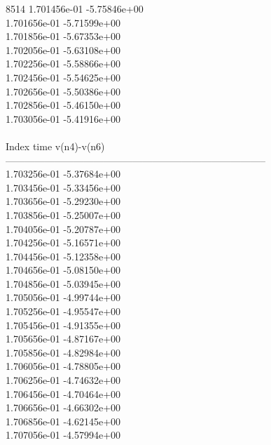 8514	1.701456e-01	-5.75846e+00	\\ 	1.701656e-01	-5.71599e+00	\\ 	1.701856e-01	-5.67353e+00	\\ 	1.702056e-01	-5.63108e+00	\\ 	1.702256e-01	-5.58866e+00	\\ 	1.702456e-01	-5.54625e+00	\\ 	1.702656e-01	-5.50386e+00	\\ 	1.702856e-01	-5.46150e+00	\\ 	1.703056e-01	-5.41916e+00	\\ \hline
\\ \hline
Index   time            v(n4)-v(n6)     \\ \hline
--------------------------------------------------------------------------------\\ 	1.703256e-01	-5.37684e+00	\\ 	1.703456e-01	-5.33456e+00	\\ 	1.703656e-01	-5.29230e+00	\\ 	1.703856e-01	-5.25007e+00	\\ 	1.704056e-01	-5.20787e+00	\\ 	1.704256e-01	-5.16571e+00	\\ 	1.704456e-01	-5.12358e+00	\\ 	1.704656e-01	-5.08150e+00	\\ 	1.704856e-01	-5.03945e+00	\\ 	1.705056e-01	-4.99744e+00	\\ 	1.705256e-01	-4.95547e+00	\\ 	1.705456e-01	-4.91355e+00	\\ 	1.705656e-01	-4.87167e+00	\\ 	1.705856e-01	-4.82984e+00	\\ 	1.706056e-01	-4.78805e+00	\\ 	1.706256e-01	-4.74632e+00	\\ 	1.706456e-01	-4.70464e+00	\\ 	1.706656e-01	-4.66302e+00	\\ 	1.706856e-01	-4.62145e+00	\\ 	1.707056e-01	-4.57994e+00	\\ \hline
